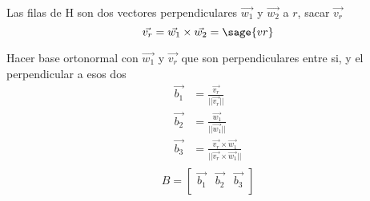 \documentclass{amsart}
\begin{document}
Las filas de H son dos vectores perpendiculares $\vec{w_1}$ y $\vec{w_2}$ a $r$, sacar $\vec{v_r}$
$$
	\vec{v_r} = \vec{w_1} \times \vec{w_2} = \sage{vr}
$$

Hacer base ortonormal con $\vec{w_1}$ y $\vec{v_r}$ que son perpendiculares entre si, y el perpendicular a esos dos
\begin{align*}
	\vec{b_1} &= \frac{\vec{v_r}}{||\vec{v_r}||} \\
	\vec{b_2} &= \frac{\vec{w_1}}{||\vec{w_1}||} \\
	\vec{b_3} &= \frac{\vec{v_r} \times \vec{w_1}}{||\vec{v_r} \times \vec{w_1}||} \\
\end{align*}
$$
	B = \begin{bmatrix}
			\vec{b_1} & \vec{b_2} & \vec{b_3} \\
		\end{bmatrix}
$$
\end{document}
